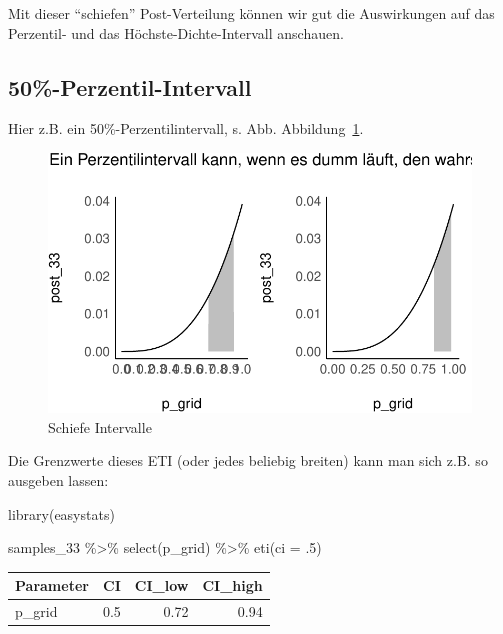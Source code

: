 \documentclass[
  a4paper,
  DIV=11]{scrreprt}
\newenvironment{Shaded}{\begin{snugshade}}{\end{snugshade}}
\newcommand{\AttributeTok}[1]{\textcolor[rgb]{0.40,0.45,0.13}{#1}}
\newcommand{\DecValTok}[1]{\textcolor[rgb]{0.68,0.00,0.00}{#1}}
\newcommand{\FunctionTok}[1]{\textcolor[rgb]{0.28,0.35,0.67}{#1}}
\newcommand{\NormalTok}[1]{\textcolor[rgb]{0.00,0.23,0.31}{#1}}
\newcommand{\SpecialCharTok}[1]{\textcolor[rgb]{0.37,0.37,0.37}{#1}}
\theoremstyle{definition}
\theoremstyle{remark}
\begin{document}
Mit dieser ``schiefen'' Post-Verteilung können wir gut die Auswirkungen
auf das Perzentil- und das Höchste-Dichte-Intervall anschauen.

\hypertarget{perzentil-intervall}{%
\subsection{50\%-Perzentil-Intervall}\label{perzentil-intervall}}

Hier z.B. ein 50\%-Perzentilintervall, s. Abb.
Abbildung~\ref{fig-schief}.

\begin{figure}

{\centering \includegraphics{./Post_files/figure-pdf/fig-schief-1.pdf}

}

\caption{\label{fig-schief}Schiefe Intervalle}

\end{figure}

Die Grenzwerte dieses ETI (oder jedes beliebig breiten) kann man sich
z.B. so ausgeben lassen:

\begin{Shaded}
\begin{Highlighting}[]
\FunctionTok{library}\NormalTok{(easystats)}

\NormalTok{samples\_33 }\SpecialCharTok{\%\textgreater{}\%} 
  \FunctionTok{select}\NormalTok{(p\_grid) }\SpecialCharTok{\%\textgreater{}\%} 
  \FunctionTok{eti}\NormalTok{(}\AttributeTok{ci =}\NormalTok{ .}\DecValTok{5}\NormalTok{)}
\end{Highlighting}
\end{Shaded}

\begin{longtable}[]{@{}lrrr@{}}
\toprule()
Parameter & CI & CI\_low & CI\_high \\
\midrule()
\endhead
p\_grid & 0.5 & 0.72 & 0.94 \\
\bottomrule()
\end{longtable}
\end{document}
